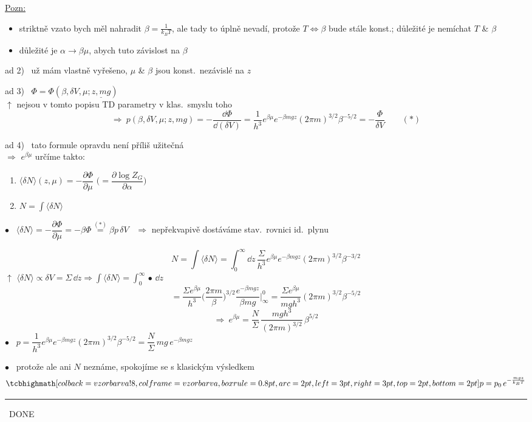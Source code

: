 {\color{NavyBlue}
\underline{Pozn:}
\begin{itemize}[nosep]
  \item striktně vzato bych měl nahradit $\beta = \frac{1}{k_BT}$, ale tady to úplně nevadí, protože $T\Leftrightarrow\beta$ bude stále
        konst.; důležité je nemíchat $T$ \& $\beta$
  \item důležité je $\alpha\to\beta\mu$, abych  tuto závislost na $\beta$
\end{itemize}

ad 2) \ už mám vlastně vyřešeno, $\mu$ \& $\beta$ jsou konst.\ nezávislé na $z$

ad 3) \ $\Phi = \Phi(\beta,\delta V,\mu;\underline{z,mg})$ \\
\hspace*{4cm}$\uparrow$ nejsou v tomto popisu TD parametry v klas.\ smyslu toho 
\[
  \Rightarrow\ p(\beta,\delta V,\mu;z,mg) = -\frac{\dd\Phi}{\dd(\delta V)}
  = \frac{1}{h^3}e^{\beta\mu}e^{-\beta mgz}(2\pi m)^{3/2}\beta^{-5/2} = -\frac{\Phi}{\delta V} \qquad (*)
\]

ad 4) \ tato formule opravdu není příliš užitečná \\
\quad $\Rightarrow$ $e^{\beta\mu}$ určíme takto:
\begin{enumerate}[label=\roman*)]
  \item $\langle\delta N\rangle(z,\mu) = -\dfrac{\partial\Phi}{\partial\mu}$ \quad $\Big(= \dfrac{\partial\log Z_G}{\partial\alpha}\Big)$
  \item $N = \displaystyle\int\langle\delta N\rangle$
\end{enumerate}
$\bullet$ \ $\langle\delta N\rangle = -\dfrac{\partial\Phi}{\partial\mu} = -\beta\Phi \overset{(*)}{=} \beta p\,\delta V$
\ $\Rightarrow$ nepřekvapivě dostáváme stav.\ rovnici id.\ plynu
}

{\color{NavyBlue}
\[
  N = \int\langle\delta N\rangle = \int_0^\infty\dd z\,\frac{\Sigma}{h^3}e^{\beta\mu}e^{-\beta mgz}(2\pi m)^{3/2}\beta^{-3/2}
\]
\hspace*{2.5cm}$\uparrow$ $\langle\delta N\rangle \propto \delta V = \Sigma\,\dd z \Rightarrow \int\langle\delta N\rangle = \int_0^\infty\bullet\,\dd z$
\[
  = \frac{\Sigma e^{\beta\mu}}{h^3}\Big(\frac{2\pi m}{\beta}\Big)^{3/2}\frac{e^{-\beta mgz}}{\beta mg}\Big|_\infty^0
  = \frac{\Sigma e^{\beta\mu}}{mgh^3}(2\pi m)^{3/2}\beta^{-5/2}
\]
\[
  \Rightarrow\ e^{\beta\mu} = \frac N\Sigma\,\frac{mgh^3}{(2\pi m)^{3/2}}\,\beta^{5/2}
\]
$\bullet$ \ $p = \dfrac{1}{h^3}e^{\beta\mu}e^{-\beta mgz}(2\pi m)^{3/2}\beta^{-5/2} = \dfrac N\Sigma\,mg\,e^{-\beta mgz}$

$\bullet$ \ protože ale ani $N$ neznáme, spokojíme se s klasickým výsledkem
\[
  \vzorec{p = p_0\,e^{-\frac{mgz}{k_BT}}}
\]
\hfill\rule{0.45\linewidth}{0.4pt} \ DONE
}
